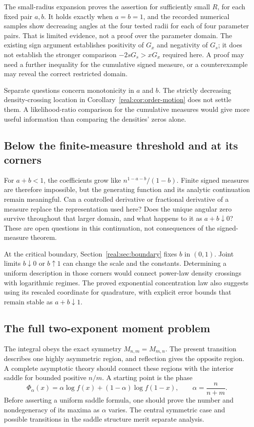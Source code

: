 The small-radius expansion proves the assertion for sufficiently
small \(R\), for each fixed pair \(a,b\).
It holds exactly when \(a=b=1\), and the recorded numerical samples
show decreasing angles at the four tested radii for each of four
parameter pairs. That is limited evidence, not a proof over the
parameter domain. The existing sign argument establishes positivity
of \(G_x\) and negativity of \(G_s\); it does not establish the
stronger comparison \(-2sG_s>xG_x\) required here.
A proof may need a further inequality for the cumulative signed
measure, or a counterexample may reveal the correct restricted domain.

Separate questions concern monotonicity in \(a\) and \(b\).
The strictly decreasing density-crossing location in
Corollary~\ref{real:cor:order-motion} does not settle them. A
likelihood-ratio comparison for the cumulative measures would give
more useful information than comparing the densities' zeros alone.

\subsection{Below the finite-measure threshold and at its corners}
For \(a+b<1\), the coefficients grow like \(n^{1-a-b}/(1-b)\).
Finite signed measures are therefore impossible, but the generating
function and its analytic continuation remain meaningful.
Can a controlled derivative or fractional derivative of a measure
replace the representation used here? Does the unique angular zero
survive throughout that larger domain, and what happens to it as
\(a+b\downarrow0\)? These are open questions in this continuation,
not consequences of the signed-measure theorem.

At the critical boundary, Section~\ref{real:sec:boundary} fixes \(b\) in
\((0,1)\). Joint limits \(b\downarrow0\) or \(b\uparrow1\) can change
the scale and the constants. Determining a uniform description in
those corners would connect power-law density crossings with
logarithmic regimes. The proved exponential concentration law also
suggests using its rescaled coordinate for quadrature, with explicit
error bounds that remain stable as \(a+b\downarrow1\).

\subsection{The full two-exponent moment problem}
The integral obeys the exact symmetry \(M_{n,m}=M_{m,n}\).
The present transition describes one highly asymmetric region, and
reflection gives the opposite region. A complete asymptotic theory
should connect these regions with the interior saddle for bounded
positive \(n/m\). A starting point is the phase
\[
 \Phi_\alpha(x)=\alpha\log f(x)+(1-\alpha)\log f(1-x),
 \qquad \alpha=\frac{n}{n+m}.
\]
Before asserting a uniform saddle formula, one should prove the
number and nondegeneracy of its maxima as \(\alpha\) varies.
The central symmetric case and possible transitions in the saddle
structure merit separate analysis.

